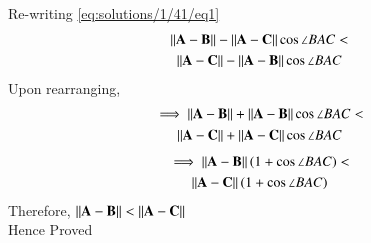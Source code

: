 Re-writing \eqref{eq:solutions/1/41/eq1}
\begin{multline}
\left\lVert\mathbf{A - B} \right\rVert-\left\lVert\mathbf{A - C} \right\rVert\cos\angle BAC<\\\left\lVert\mathbf{ A - C}\right\rVert-\left\lVert\mathbf{A - B} \right\rVert\cos\angle BAC
\end{multline}  
Upon rearranging,
\begin{multline}
\implies\left\lVert\mathbf{A - B} \right\rVert+\left\lVert\mathbf{A - B} \right\rVert\cos\angle BAC<\\\left\lVert\mathbf{A - C}\right\rVert+\left\lVert\mathbf{A - C} \right\rVert\cos\angle BAC\end{multline}
\begin{multline}
\implies
\left\lVert\mathbf{A - B} \right\rVert(1+\cos\angle BAC)<\\\left\lVert\mathbf{A - C} \right\rVert(1+\cos\angle BAC)\end{multline}
Therefore,
$\left\lVert\mathbf{A - B}\right\rVert < \left\lVert\mathbf{A - C}\right\rVert$\\
Hence Proved


